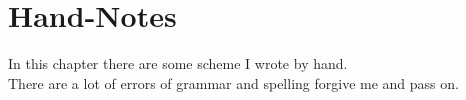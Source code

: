 \chapter{Hand-Notes}
In this chapter there are some scheme I wrote by hand.\\
There are a lot of errors of grammar and spelling forgive me and pass on.

